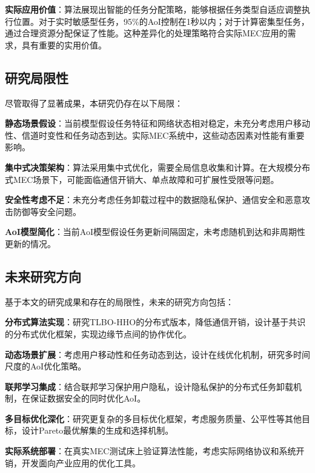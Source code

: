 \documentclass[conference]{IEEEtran}
\begin{document}
\textbf{实际应用价值}：算法展现出智能的任务分配策略，能够根据任务类型自适应调整执行位置。对于实时敏感型任务，95\%的AoI控制在1秒以内；对于计算密集型任务，通过合理资源分配保证了性能。这种差异化的处理策略符合实际MEC应用的需求，具有重要的实用价值。

\subsection{研究局限性}
尽管取得了显著成果，本研究仍存在以下局限：

\textbf{静态场景假设}：当前模型假设任务特征和网络状态相对稳定，未充分考虑用户移动性、信道时变性和任务动态到达。实际MEC系统中，这些动态因素对性能有重要影响。

\textbf{集中式决策架构}：算法采用集中式优化，需要全局信息收集和计算。在大规模分布式MEC场景下，可能面临通信开销大、单点故障和可扩展性受限等问题。

\textbf{安全性考虑不足}：未充分考虑任务卸载过程中的数据隐私保护、通信安全和恶意攻击防御等安全问题。

\textbf{AoI模型简化}：当前AoI模型假设任务更新间隔固定，未考虑随机到达和非周期性更新的情况。

\subsection{未来研究方向}
基于本文的研究成果和存在的局限性，未来的研究方向包括：

\textbf{分布式算法实现}：研究TLBO-HHO的分布式版本，降低通信开销，设计基于共识的分布式优化框架，实现边缘节点间的协作优化。

\textbf{动态场景扩展}：考虑用户移动性和任务动态到达，设计在线优化机制，研究多时间尺度的AoI优化策略。

\textbf{联邦学习集成}：结合联邦学习保护用户隐私，设计隐私保护的分布式任务卸载机制，在保证数据安全的同时优化AoI。

\textbf{多目标优化深化}：研究更复杂的多目标优化框架，考虑服务质量、公平性等其他目标，设计Pareto最优解集的生成和选择机制。

\textbf{实际系统部署}：在真实MEC测试床上验证算法性能，考虑实际网络协议和系统开销，开发面向产业应用的优化工具。
\end{document}
